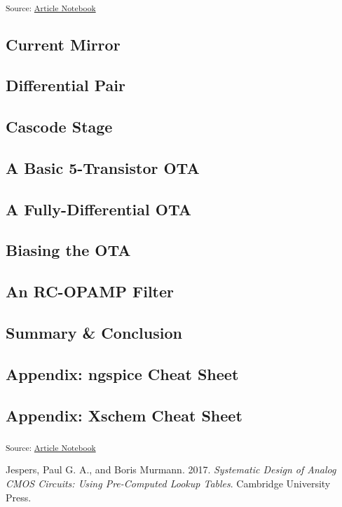 \documentclass[
  a4paper,
  DIV=11,
  numbers=noendperiod]{scrartcl}
\newlength{\cslhangindent}
\newenvironment{CSLReferences}[2] %
 {\begin{list}{}{%
  \setlength{\itemindent}{0pt}
  \setlength{\leftmargin}{0pt}
  \setlength{\parsep}{0pt}
  \ifodd #1
   \setlength{\leftmargin}{\cslhangindent}
   \setlength{\itemindent}{-1\cslhangindent}
  \fi
  \setlength{\itemsep}{#2\baselineskip}}}
 {\end{list}}
\begin{document}
\textsubscript{Source:
\href{https://iic-jku.github.io/analog-circuit-design/index.qmd.html}{Article
Notebook}}

\subsection{Current Mirror}\label{current-mirror}

\subsection{Differential Pair}\label{differential-pair}

\subsection{Cascode Stage}\label{cascode-stage}

\subsection{A Basic 5-Transistor OTA}\label{a-basic-5-transistor-ota}

\subsection{A Fully-Differential OTA}\label{a-fully-differential-ota}

\subsection{Biasing the OTA}\label{biasing-the-ota}

\subsection{An RC-OPAMP Filter}\label{an-rc-opamp-filter}

\subsection{Summary \& Conclusion}\label{summary-conclusion}

\subsection{Appendix: ngspice Cheat
Sheet}\label{appendix-ngspice-cheat-sheet}

\subsection{Appendix: Xschem Cheat
Sheet}\label{appendix-xschem-cheat-sheet}

\textsubscript{Source:
\href{https://iic-jku.github.io/analog-circuit-design/index.qmd.html}{Article
Notebook}}

\label{refs}
\begin{CSLReferences}{1}{0}
Jespers, Paul G. A., and Boris Murmann. 2017. \emph{Systematic Design of
Analog CMOS Circuits: Using Pre-Computed Lookup Tables}. Cambridge
University Press.

\end{CSLReferences}
\end{document}
